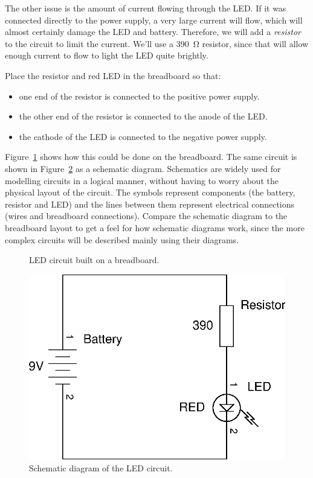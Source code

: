 \documentclass{article}
\begin{document}
The other issue is the amount of current flowing through the LED. If it was
connected directly to the power supply, a very large current will flow, which
will almost certainly damage the LED and battery. Therefore, we will add a
\emph{resistor} to the circuit to limit the current. We'll use a
\SI{390}{\ohm} resistor, since that will allow enough current to flow to light
the LED quite brightly.

Place the resistor and red LED in the breadboard so that:

\begin{itemize}
\item one end of the resistor is connected to the positive power supply.
\item the other end of the resistor is connected to the anode of the LED.
\item the cathode of the LED is connected to the negative power supply.
\end{itemize}

Figure~\ref{fig:breadboard:led} shows how this could be done on the breadboard.
The same circuit is shown in Figure~\ref{fig:schem:led} as a schematic diagram.
Schematics are widely used for modelling circuits in a logical manner, without
having to worry about the physical layout of the circuit. The symbols represent
components (the battery, resistor and LED) and the lines between them represent
electrical connections (wires and breadboard connections). Compare the schematic
diagram to the breadboard layout to get a feel for how schematic diagrams work,
since the more complex circuits will be described mainly using their diagrams.

\begin{figure}
\centering
{}
\caption{LED circuit built on a breadboard.}
\label{fig:breadboard:led}
\end{figure}

\begin{figure}
\centering
\includegraphics[width=\textwidth]{assets/fig/schem/led}
\caption{Schematic diagram of the LED circuit.}
\label{fig:schem:led}
\end{figure}
\end{document}
